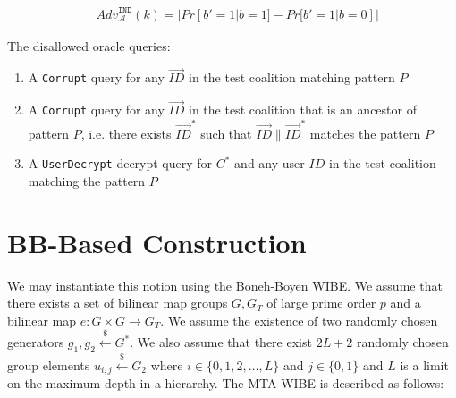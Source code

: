\documentclass[10pt]{llncs}
\newcommand{\A}{\mathcal{A}}
\newcommand{\ID}{\mathit{ID}}
\newcommand{\TA}{\mathit{TA}}
\newcommand{\getsr}{\stackrel{{\scriptscriptstyle\$}}{\gets}}
\newcommand{\adv}[2]{\mathit{Adv}_{#1}^{\texttt{#2}}}
\begin{document}
\begin{eqnarray*}
	& \adv{\A}{IND}(k) = |Pr[b'=1|b=1]-Pr[b'=1|b=0]|
\end{eqnarray*}

The disallowed oracle queries:
\begin{enumerate}
	\item A \texttt{Corrupt} query for any $\vec{\ID}$ in the test coalition matching pattern $\mathit{P}$
	\item A \texttt{Corrupt} query for any $\vec{\ID}$ in the test coalition that is an ancestor of pattern $\mathit{P}$, i.e. there exists $\vec{\ID}^*$ such that $\vec{\ID}\|\vec{\ID}^*$ matches the pattern $\mathit{P}$ %
	\item A \texttt{UserDecrypt} decrypt query for $C^{*}$ and any user $\ID$ in the test coalition matching the pattern $\mathit{P}$ %
\end{enumerate}

\section{BB-Based Construction}

We may instantiate this notion using the Boneh-Boyen WIBE. We assume that there exists a set of bilinear map groups $G, G_{T}$ of large prime order $p$ and a bilinear map $e: G \times G \rightarrow G_{T}$. We assume the existence of two randomly chosen generators $g_{1},g_{2}\getsr G^{*}$. We also assume that there exist $2L+2$ randomly chosen group elements $u_{i,j} \getsr G_{2}$ where $i\in \{0,1,2,\ldots,L\}$ and $j\in \{0,1\}$ and $L$ is a limit on the maximum depth in a hierarchy. The MTA-WIBE is described as follows:
\end{document}
